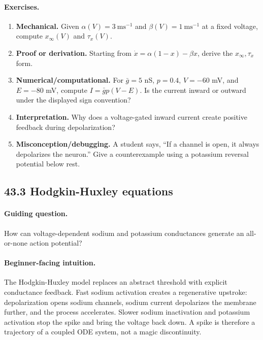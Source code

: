 \paragraph{Exercises.}
\begin{enumerate}[label=\textbf{43.2.\arabic*.}, leftmargin=*]
\item \textbf{Mechanical.} Given \(\alpha(V)=3\ \mathrm{ms}^{-1}\) and \(\beta(V)=1\ \mathrm{ms}^{-1}\) at a fixed voltage, compute \(x_\infty(V)\) and \(\tau_x(V)\).
\item \textbf{Proof or derivation.} Starting from \(\dot x=\alpha(1-x)-\beta x\), derive the \(x_\infty,\tau_x\) form.
\item \textbf{Numerical/computational.} For \(\bar g=5\) nS, \(p=0.4\), \(V=-60\) mV, and \(E=-80\) mV, compute \(I=\bar g p(V-E)\). Is the current inward or outward under the displayed sign convention?
\item \textbf{Interpretation.} Why does a voltage-gated inward current create positive feedback during depolarization?
\item \textbf{Misconception/debugging.} A student says, ``If a channel is open, it always depolarizes the neuron.'' Give a counterexample using a potassium reversal potential below rest.
\end{enumerate}

\subsection{43.3 Hodgkin-Huxley equations}

\paragraph{Guiding question.}
How can voltage-dependent sodium and potassium conductances generate an all-or-none action potential?

\paragraph{Beginner-facing intuition.}
The Hodgkin-Huxley model replaces an abstract threshold with explicit conductance feedback. Fast sodium activation creates a regenerative upstroke: depolarization opens sodium channels, sodium current depolarizes the membrane further, and the process accelerates. Slower sodium inactivation and potassium activation stop the spike and bring the voltage back down. A spike is therefore a trajectory of a coupled ODE system, not a magic discontinuity.

